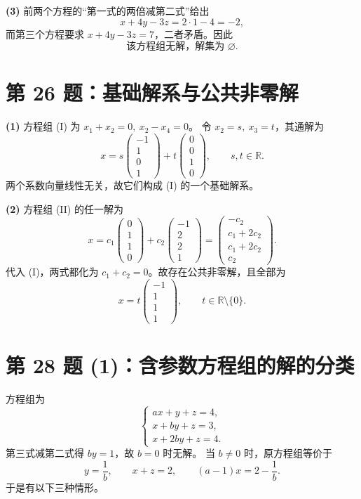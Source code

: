\documentclass[11pt,a4paper,fontset=fandol]{ctexart}
\newcommand{\problem}[1]{\Needspace{6\baselineskip}\section*{#1}}
\newcommand{\ans}[1]{\boxed{#1}}
\newcommand{\R}{\mathbb R}
\begin{document}
\textbf{(3)} 前两个方程的“第一式的两倍减第二式”给出
\[
x+4y-3z=2\cdot1-4=-2,
\]
而第三个方程要求 $x+4y-3z=7$，二者矛盾。因此
\[
\ans{\text{该方程组无解，解集为 }\varnothing.}
\]

\problem{第 26 题：基础解系与公共非零解}
\textbf{(1)} 方程组 (I) 为 $x_1+x_2=0,\ x_2-x_4=0$。
令 $x_2=s,\ x_3=t$，其通解为
\[
x=s\begin{pmatrix}-1\\1\\0\\1\end{pmatrix}
+t\begin{pmatrix}0\\0\\1\\0\end{pmatrix},\qquad s,t\in\R.
\]
两个系数向量线性无关，故它们构成 (I) 的一个基础解系。

\textbf{(2)} 方程组 (II) 的任一解为
\[
x=c_1\begin{pmatrix}0\\1\\1\\0\end{pmatrix}
+c_2\begin{pmatrix}-1\\2\\2\\1\end{pmatrix}
=\begin{pmatrix}-c_2\\c_1+2c_2\\c_1+2c_2\\c_2\end{pmatrix}.
\]
代入 (I)，两式都化为 $c_1+c_2=0$。故存在公共非零解，且全部为
\[
\ans{x=t\begin{pmatrix}-1\\1\\1\\1\end{pmatrix},\qquad t\in\R\setminus\{0\}.}
\]

\newpage
\problem{第 28 题 (1)：含参数方程组的解的分类}
方程组为
\[
\begin{cases}
ax+y+z=4,\\
x+by+z=3,\\
x+2by+z=4.
\end{cases}
\]
第三式减第二式得 $by=1$，故 $b=0$ 时无解。
当 $b\ne0$ 时，原方程组等价于
\[
y=\frac1b,\qquad x+z=2,\qquad (a-1)x=2-\frac1b.
\]
于是有以下三种情形。
\end{document}
